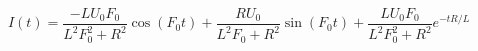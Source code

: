 \documentclass{article}
\begin{document}
$$
I(t) = \frac{-L U_0 F_0}{L^2 F_0^2 + R^2}\cos(F_0t) +  \frac{R U_0}{L^2 F_0 + R^2}\sin(F_0 t) + \frac{L U_0 F_0}{L^2 F_0^2 + R^2}e^{-tR/L} 
$$
\end{document}
